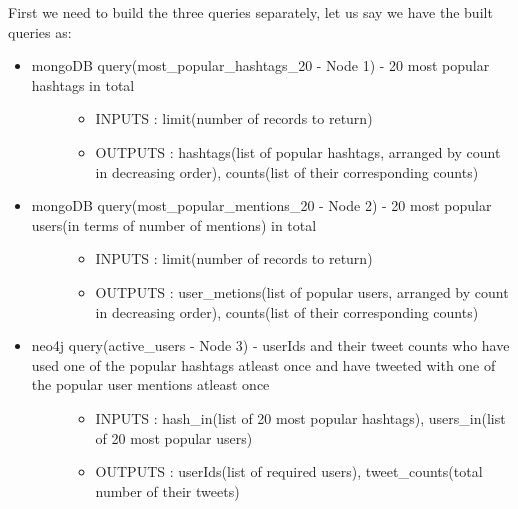 \documentclass[letterpaper,10pt,english]{sphinxmanual}
\begin{document}
First we need to build the three queries separately, let us say we have the built queries as:
\begin{itemize}
\item {} \begin{description}
\item[{mongoDB query(most\_popular\_hashtags\_20 - Node 1) - 20 most popular hashtags in total}] \leavevmode\begin{itemize}
\item {} 
INPUTS  : limit(number of records to return)

\item {} 
OUTPUTS : hashtags(list of popular hashtags, arranged by count in decreasing order), counts(list of their corresponding counts)

\end{itemize}

\end{description}

\item {} \begin{description}
\item[{mongoDB query(most\_popular\_mentions\_20 - Node 2) - 20 most popular users(in terms of number of mentions) in total}] \leavevmode\begin{itemize}
\item {} 
INPUTS  : limit(number of records to return)

\item {} 
OUTPUTS : user\_metions(list of popular users, arranged by count in decreasing order), counts(list of their corresponding counts)

\end{itemize}

\end{description}

\item {} \begin{description}
\item[{neo4j query(active\_users - Node 3)   - userIds and their tweet counts who have used one of the popular hashtags atleast once and have tweeted with one of the popular user mentions atleast once}] \leavevmode\begin{itemize}
\item {} 
INPUTS  : hash\_in(list of 20 most popular hashtags), users\_in(list of 20 most popular users)

\item {} 
OUTPUTS : userIds(list of required users), tweet\_counts(total number of their tweets)

\end{itemize}

\end{description}

\end{itemize}
\end{document}
